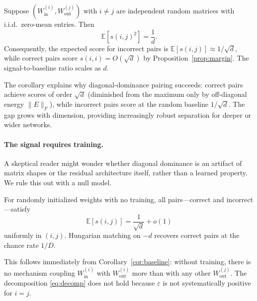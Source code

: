 \documentclass[wcp]{jmlr}
\begin{document}
\begin{corollary}\label{cor:baseline}
Suppose $(W_{\mathrm{in}}^{(i)}, W_{\mathrm{out}}^{(j)})$ with $i \neq j$ are independent random matrices with i.i.d.\ zero-mean entries. Then
\begin{equation}\label{eq:baseline}
  \mathbb{E}[s(i,j)^2] = \frac{1}{d}.
\end{equation}
Consequently, the expected score for incorrect pairs is $\mathbb{E}[s(i,j)] \approx 1/\sqrt{d}$, while correct pairs score $s(i,i) = O(\sqrt{d})$ by Proposition~\ref{prop:margin}. The signal-to-baseline ratio scales as $d$.
\end{corollary}

The corollary explains why diagonal-dominance pairing succeeds: correct pairs achieve scores of order $\sqrt{d}$ (diminished from the maximum only by off-diagonal energy $\|E\|_F$), while incorrect pairs score at the random baseline $1/\sqrt{d}$. The gap grows with dimension, providing increasingly robust separation for deeper or wider networks.

\paragraph{The signal requires training.} A skeptical reader might wonder whether diagonal dominance is an artifact of matrix shapes or the residual architecture itself, rather than a learned property. We rule this out with a null model.

\begin{corollary}\label{cor:null-model}
For randomly initialized weights with no training, all pairs---correct and incorrect---satisfy
\begin{equation}\label{eq:null}
  \mathbb{E}[s(i,j)] = \frac{1}{\sqrt{d}} + o(1)
\end{equation}
uniformly in $(i,j)$. Hungarian matching on $-d$ recovers correct pairs at the chance rate $1/D$.
\end{corollary}

This follows immediately from Corollary~\ref{cor:baseline}: without training, there is no mechanism coupling $W_{\mathrm{in}}^{(i)}$ with $W_{\mathrm{out}}^{(i)}$ more than with any other $W_{\mathrm{out}}^{(j)}$. The decomposition \eqref{eq:decomp} does not hold because $\varepsilon$ is not systematically positive for $i = j$.
\end{document}
